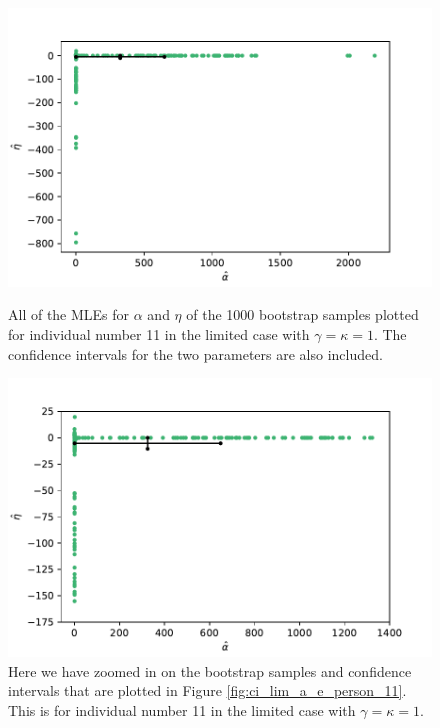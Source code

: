 \begin{figure}
    \centering
    \begin{minipage}{0.48\textwidth}
        \centering
        \includegraphics[scale=0.36]{pictures/ci_lim_a_e_person11_pdf.pdf}
        \caption[MLEs for $\alpha$ and $\eta$ for bootstrap samples individual 11, limited]{All of the MLEs for $\alpha$ and $\eta$ of the 1000 bootstrap samples plotted for individual number 11 in the limited case with $\gamma=\kappa=1$. The confidence intervals for the two parameters are also included.}
        \label{fig:ci_lim_a_e_person_11}
    \end{minipage}\hfill
    \begin{minipage}{0.48\textwidth}
        \centering
        \includegraphics[scale=0.36]{pictures/ci_lim_a_e_person11_zoomed_pdf.pdf}
        \caption[MLEs for $\alpha$ and $\eta$ of bootstrap samples individual 11, unlimited, zoomed]{Here we have zoomed in on the bootstrap samples and confidence intervals that are plotted in Figure \ref{fig:ci_lim_a_e_person_11}. This is for individual number 11 in the limited case with $\gamma=\kappa=1$.}
        \label{fig:ci_lim_a_e_person_11_zoomed}
    \end{minipage}
\end{figure}

